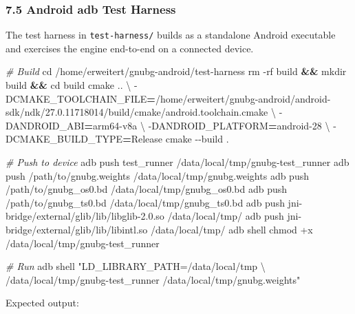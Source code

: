 \documentclass[11pt,a4paper]{article}
\newenvironment{Shaded}{%
  \setlength{\FrameSep}{4pt}%
  \definecolor{shadecolor}{RGB}{245,245,245}%
  \begin{snugshade}\footnotesize
}{\end{snugshade}}
\newcommand{\AttributeTok}[1]{\textcolor[rgb]{0.13,0.29,0.53}{#1}}
\newcommand{\BuiltInTok}[1]{#1}
\newcommand{\CommentTok}[1]{\textcolor[rgb]{0.56,0.35,0.01}{\textit{#1}}}
\newcommand{\DataTypeTok}[1]{\textcolor[rgb]{0.13,0.29,0.53}{#1}}
\newcommand{\ExtensionTok}[1]{#1}
\newcommand{\FunctionTok}[1]{\textcolor[rgb]{0.13,0.29,0.53}{#1}}
\newcommand{\KeywordTok}[1]{\textcolor[rgb]{0.13,0.29,0.53}{\textbf{#1}}}
\newcommand{\NormalTok}[1]{#1}
\newcommand{\OperatorTok}[1]{\textcolor[rgb]{0.81,0.36,0.00}{\textbf{#1}}}
\newcommand{\StringTok}[1]{\textcolor[rgb]{0.31,0.60,0.02}{#1}}
\begin{document}
\subsubsection{7.5 Android adb Test
Harness}\label{android-adb-test-harness}

The test harness in \texttt{test-harness/} builds as a standalone
Android executable and exercises the engine end-to-end on a connected
device.

\begin{Shaded}
\begin{Highlighting}[]
\CommentTok{\# Build}
\BuiltInTok{cd}\NormalTok{ /home/erweitert/gnubg{-}android/test{-}harness}
\FunctionTok{rm} \AttributeTok{{-}rf}\NormalTok{ build }\KeywordTok{\&\&} \FunctionTok{mkdir}\NormalTok{ build }\KeywordTok{\&\&} \BuiltInTok{cd}\NormalTok{ build}
\FunctionTok{cmake}\NormalTok{ .. }\DataTypeTok{\textbackslash{}}
  \AttributeTok{{-}DCMAKE\_TOOLCHAIN\_FILE}\OperatorTok{=}\NormalTok{/home/erweitert/gnubg{-}android/android{-}sdk/ndk/27.0.11718014/build/cmake/android.toolchain.cmake }\DataTypeTok{\textbackslash{}}
  \AttributeTok{{-}DANDROID\_ABI}\OperatorTok{=}\NormalTok{arm64{-}v8a }\DataTypeTok{\textbackslash{}}
  \AttributeTok{{-}DANDROID\_PLATFORM}\OperatorTok{=}\NormalTok{android{-}28 }\DataTypeTok{\textbackslash{}}
  \AttributeTok{{-}DCMAKE\_BUILD\_TYPE}\OperatorTok{=}\NormalTok{Release}
\FunctionTok{cmake} \AttributeTok{{-}{-}build}\NormalTok{ .}

\CommentTok{\# Push to device}
\ExtensionTok{adb}\NormalTok{ push test\_runner /data/local/tmp/gnubg{-}test\_runner}
\ExtensionTok{adb}\NormalTok{ push /path/to/gnubg.weights   /data/local/tmp/gnubg.weights}
\ExtensionTok{adb}\NormalTok{ push /path/to/gnubg\_os0.bd   /data/local/tmp/gnubg\_os0.bd}
\ExtensionTok{adb}\NormalTok{ push /path/to/gnubg\_ts0.bd   /data/local/tmp/gnubg\_ts0.bd}
\ExtensionTok{adb}\NormalTok{ push jni{-}bridge/external/glib/lib/libglib{-}2.0.so /data/local/tmp/}
\ExtensionTok{adb}\NormalTok{ push jni{-}bridge/external/glib/lib/libintl.so     /data/local/tmp/}
\ExtensionTok{adb}\NormalTok{ shell chmod +x /data/local/tmp/gnubg{-}test\_runner}

\CommentTok{\# Run}
\ExtensionTok{adb}\NormalTok{ shell }\StringTok{"LD\_LIBRARY\_PATH=/data/local/tmp }\DataTypeTok{\textbackslash{}}
\StringTok{    /data/local/tmp/gnubg{-}test\_runner /data/local/tmp/gnubg.weights"}
\end{Highlighting}
\end{Shaded}

Expected output:
\end{document}
